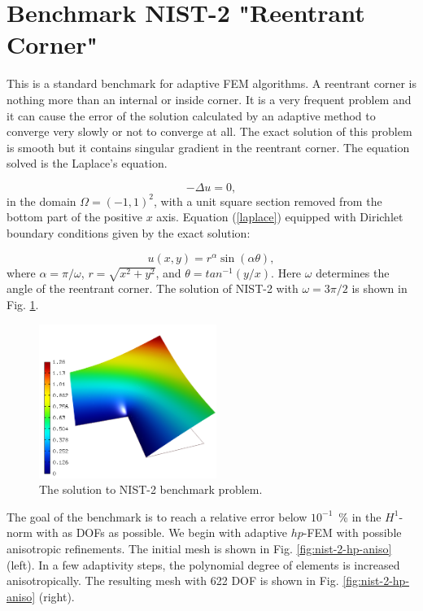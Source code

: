 \section{Benchmark NIST-2 "Reentrant Corner"}
\label{sec:bench-2}

This is a standard benchmark for adaptive FEM algorithms.
A reentrant corner is nothing more than an internal or inside corner.
It is a very frequent problem and it can cause the error of the solution calculated by an adaptive method to converge very slowly or not to converge at all.
The exact solution of this problem is smooth but it contains
singular gradient in the reentrant corner.
The equation solved is the Laplace's equation.

\begin{equation} \label{laplace}
-\Delta u = 0,
\end{equation}
in the domain $\Omega = (-1, 1)^2$, with a unit square
section removed from the bottom part of the positive $x$ axis.
Equation (\ref{laplace}) equipped with Dirichlet
boundary conditions given by the exact solution:

\begin{equation}\label{exact-nist-2}
u(x, y) = r^{\alpha}\sin(\alpha \theta),
\end{equation}
where $\alpha = \pi / \omega$, $r = \sqrt{x^2+y^2}$,
and $\theta = tan^{-1}(y/x)$. Here $\omega $ determines
the angle of the reentrant corner.
The solution of NIST-2 with $\omega = 3 \pi / 2$
is shown in Fig. \ref{fig:sln-nist02}.

\begin{figure}[!ht]
\centering
\includegraphics[height=5cm]{nist/nist-2/solution.png}
\caption{The solution to NIST-2 benchmark problem.}
\label{fig:sln-nist02}
\end{figure}
\noindent

The goal of the benchmark is to reach a relative error below
$10^{-1}$~\% in the $H^1$-norm with as DOFs as possible.
We begin with adaptive $hp$-FEM with possible anisotropic refinements.
The initial mesh is shown in Fig. \ref{fig:nist-2-hp-aniso} (left).
In a few adaptivity steps, the polynomial degree of elements is increased
anisotropically.
The resulting mesh with 622 DOF is shown in Fig. \ref{fig:nist-2-hp-aniso} (right).

